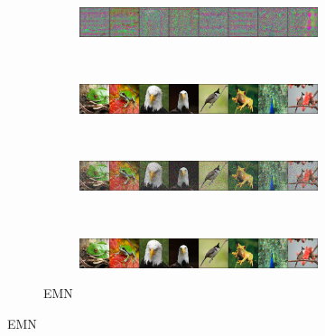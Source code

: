 \documentclass[conference]{IEEEtran}
\theoremstyle{definition}
\theoremstyle{remark}
\theoremstyle{proposition}
\begin{document}
\begin{figure}[htp!]
\begin{subfigure}{.90\textwidth}
    \end{subfigure}
    \begin{subfigure}{.90\textwidth}
        \hspace{0.95em}
    	\begin{subfigure}{.90\textwidth}
    		\centering
    		\includegraphics[width=1.0\textwidth, valign=c]{samples/ImageNet-EM/pert_adv.png}
    	\end{subfigure}\\
        \hspace{0.75em}
    	\begin{subfigure}{.90\textwidth}
    		\centering
    		\includegraphics[width=1.0\textwidth, valign=c]{samples/ImageNet-EM/original_input.png}
    	\end{subfigure}\\
        \hspace{0.75em}
    	\begin{subfigure}{.90\textwidth}
    		\centering
    		\includegraphics[width=1.0\textwidth, valign=c]{samples/ImageNet-EM/init_0.png}
    	\end{subfigure}\\
        \hspace{0.95em}
    	\begin{subfigure}{.90\textwidth}
    		\centering
    		\includegraphics[width=1.0\textwidth, valign=c]{samples/ImageNet-EM/samples_0.png}
    	\end{subfigure}
	\caption{EMN~\citep{huang2021emn}}
    \end{subfigure}
	\label{fig:IN_samples_I}
\end{figure}
\end{document}
